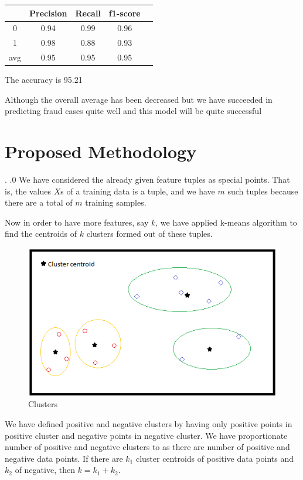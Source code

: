 \begin{center}
\begin{tabular}{| c | c | c | c | c |}
\hline
    & Precision & Recall & f1-score \\
\hline
0 & 0.94 & 0.99 & 0.96 \\
\hline
1 & 0.98 & 0.88 & 0.93 \\
\hline
avg & 0.95 & 0.95 & 0.95 \\
\hline
\end{tabular}
\end{center}
\begin{center}
The accuracy is 95.21%
\end{center}
Although the overall average has been decreased but we have succeeded in predicting fraud cases quite well and this model will be quite successful
\section{ Proposed Methodology}.
.0 
We have considered the already given feature tuples as special points. That is, the values $X$s of a training data is a tuple, and we have $m$ such tuples because there are a total of $m$ training samples. 

Now in order to have more features, say $k$, we have applied k-means algorithm to find the centroids of $k$ clusters formed out of these tuples.


\begin{figure}
  \centering
  \includegraphics[scale=.6]{chapters/kachra3.png}
  \caption{Clusters}
  
\end{figure}

We have defined positive and negative clusters by having only positive points in positive cluster and negative points in negative cluster. We have proportionate number of positive and negative clusters to as there are number of positive and negative data points. If there are $k_1$ cluster centroids of positive data points and $k_2$ of negative, then $k=k_1+k_2$. ~\cite{maind2014research}

